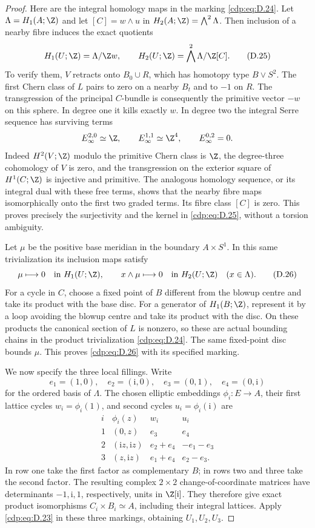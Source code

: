 \begin{proof}
Here are the integral homology maps in the marking \eqref{cdp:eq:D.24}.
Let $\Lambda=H_1(A;\Z)$ and let $[C]=w\wedge u$ in
$H_2(A;\Z)=\bigwedge^2\Lambda$. Then inclusion of a nearby
fibre induces the exact quotients
\[
 H_1(U;\Z)=\Lambda/\Z w,\qquad
 H_2(U;\Z)=\bigwedge^2\Lambda/\Z[C].
\tag{D.25}\label{cdp:eq:D.25}
\]
To verify them, $V$ retracts onto $B_0\cup R$, which has
homotopy type $B\vee S^2$. The first Chern class of $L$
pairs to zero on a nearby $B_t$ and to $-1$ on $R$.
The transgression of the principal $C$-bundle is consequently
the primitive vector $-w$ on this sphere. In degree one it
kills exactly $w$. In degree two the integral Serre sequence
has surviving terms
\[
 E_\infty^{2,0}\simeq\Z,
 \qquad E_\infty^{1,1}\simeq\Z^4,
 \qquad E_\infty^{0,2}=0.
\]
Indeed $H^2(V;\Z)$ modulo the primitive Chern class is
$\Z$, the degree-three cohomology of $V$ is zero, and the
transgression on the exterior square of $H^1(C;\Z)$ is
injective and primitive. The analogous homology sequence,
or its integral dual with these free terms, shows that the
nearby fibre maps isomorphically onto the first two graded
terms. Its fibre class $[C]$ is zero. This proves precisely
the surjectivity and the kernel in \eqref{cdp:eq:D.25}, without a torsion
ambiguity.

Let $\mu$ be the positive base meridian in the boundary
$A\times S^1$. In this same trivialization its inclusion
maps satisfy
\[
 \mu\longmapsto0\quad\hbox{in }H_1(U;\Z),
 \qquad
 x\wedge\mu\longmapsto0\quad\hbox{in }H_2(U;\Z)
 \quad(x\in\Lambda).
\tag{D.26}\label{cdp:eq:D.26}
\]
For a cycle in $C$, choose a fixed point of $B$ different
from the blowup centre and take its product with the base
disc. For a generator of $H_1(B;\Z)$, represent it by a loop
avoiding the blowup centre and take its product with the
disc. On these products the canonical section of $L$ is
nonzero, so these are actual bounding chains in the product
trivialization \eqref{cdp:eq:D.24}. The same fixed-point disc bounds
$\mu$. This proves \eqref{cdp:eq:D.26} with its specified marking.

We now specify the three local fillings. Write
\[
 e_1=(1,0),\quad e_2=(\mathrm i,0),\quad
 e_3=(0,1),\quad e_4=(0,\mathrm i)
\]
for the ordered basis of $\Lambda$. The chosen elliptic
embeddings $\phi_i:E\to A$, their first lattice cycles
$w_i=\phi_i(1)$, and second cycles $u_i=\phi_i(\mathrm i)$ are
\[
\begin{array}{c|c|c|c}
 i&\phi_i(z)&w_i&u_i\\ \hline
 1&(0,z)&e_3&e_4\\
 2&(\mathrm i z,\mathrm i z)&e_2+e_4&-e_1-e_3\\
 3&(z,\mathrm i z)&e_1+e_4&e_2-e_3.
\end{array}
\tag{D.27}\label{cdp:eq:D.27}
\]
In row one take the first factor as complementary $B$; in
rows two and three take the second factor. The resulting
complex $2\times2$ change-of-coordinate matrices have
determinants $-1,\mathrm i,1$, respectively, units in
$\Z[\mathrm i]$. They therefore give exact product
isomorphisms $C_i\times B_i\simeq A$, including their
integral lattices. Apply \eqref{cdp:eq:D.23} in these three markings,
obtaining $U_1,U_2,U_3$.


\end{proof}
